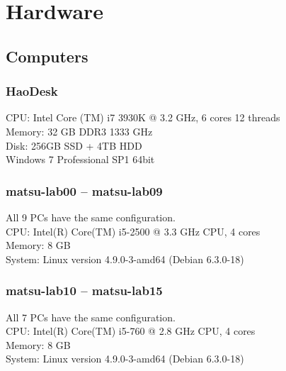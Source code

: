 \section{Hardware}
\label{app:hardware}
\subsection{Computers}
\subsubsection{HaoDesk}
\label{HaoDesk}

CPU: Intel Core (TM) i7 3930K @ 3.2 GHz, 6 cores 12 threads\\
Memory: 32 GB DDR3 1333 GHz\\
Disk: 256GB SSD + 4TB HDD\\
Windows 7 Professional SP1 64bit

\subsubsection{matsu-lab00 -- matsu-lab09}
\label{matsu-labA}
All 9 PCs have the same configuration.\\
CPU: Intel(R) Core(TM) i5-2500 @ 3.3 GHz CPU, 4 cores\\
Memory: 8 GB \\
System: Linux version 4.9.0-3-amd64 (Debian 6.3.0-18)

\subsubsection{matsu-lab10 -- matsu-lab15}
\label{matsu-labB} 
All 7 PCs have the same configuration.\\
CPU: Intel(R) Core(TM) i5-760 @ 2.8 GHz CPU, 4 cores\\
Memory: 8 GB \\
System: Linux version 4.9.0-3-amd64 (Debian 6.3.0-18)

%



